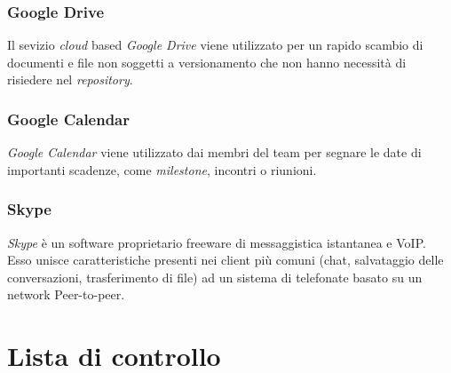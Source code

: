 \subsubsection{Google Drive}
Il sevizio \emph{cloud} based \emph{Google Drive} viene utilizzato
per un rapido scambio di documenti e file non soggetti a versionamento
che non hanno necessità di risiedere nel \emph{repository}.

\subsubsection{Google Calendar}
\emph{Google Calendar} viene utilizzato dai membri del team per
segnare le date di importanti scadenze, come \emph{milestone},
incontri o riunioni. 

\subsubsection{Skype}
\emph{Skype} è un software proprietario freeware di messaggistica
istantanea e VoIP. Esso unisce caratteristiche presenti nei client più
comuni (chat, salvataggio delle conversazioni, trasferimento di file)
ad un sistema di telefonate basato su un network Peer-to-peer. 


\clearpage

\appendix



\section{Lista di controllo}



